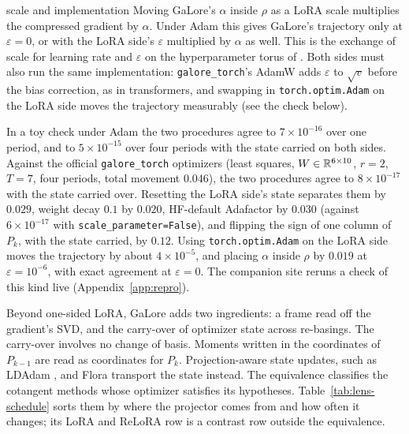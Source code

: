 \begin{remark*}{scale and implementation}
Moving GaLore's $\alpha$ inside $\rho$ as a LoRA scale multiplies the compressed gradient by $\alpha$. Under Adam this
gives GaLore's trajectory only at $\varepsilon=0$, or with the LoRA side's $\varepsilon$ multiplied by $\alpha$ as well.
This is the exchange of scale for learning rate and $\varepsilon$ on the hyperparameter torus of
. Both sides must also run the same implementation: \texttt{galore\_torch}'s AdamW adds
$\varepsilon$ to $\sqrt v$ before the bias correction, as in transformers, and swapping in \texttt{torch.optim.Adam} on
the LoRA side moves the trajectory measurably (see the check below).
\end{remark*}

\noindent{}\enspace In a toy check under Adam the two procedures agree to $7\times10^{-16}$ over one
period, and to $5\times10^{-15}$ over four periods with the state carried on both sides. Against the official
\texttt{galore\_torch} optimizers (least squares, $W\in\mathbb{R}^{6\times10}$, $r=2$, $T=7$, four periods, total movement
$0.046$), the two procedures agree to $8\times10^{-17}$ with the state carried over. Resetting the LoRA side's state
separates them by $0.029$, weight decay $0.1$ by $0.020$, HF-default Adafactor by $0.030$ (against $6\times10^{-17}$
with \texttt{scale\_\allowbreak parameter=False}), and flipping the sign of one column of $P_k$, with the state carried, by $0.12$.
Using \texttt{torch.optim.Adam} on the LoRA side moves the trajectory by about $4\times10^{-5}$, and placing $\alpha$
inside $\rho$ by $0.019$ at $\varepsilon=10^{-6}$, with exact agreement at $\varepsilon=0$. The companion site reruns a
check of this kind live (Appendix~\ref{app:repro}).

\begin{explains}
Beyond one-sided LoRA, GaLore adds two ingredients: a frame read off the gradient's SVD, and the carry-over of optimizer
state across re-basings. The carry-over involves no change of basis. Moments written in the coordinates of $P_{k-1}$
are read as coordinates for $P_k$. Projection-aware state updates, such as LDAdam \citep{xrobert2025ldadam}, and Flora
transport the state instead. The equivalence classifies the cotangent methods whose optimizer satisfies its hypotheses.
Table~\ref{tab:lens-schedule} sorts them by where the projector comes from and how often it changes; its LoRA and
ReLoRA row is a contrast row outside the equivalence.
\end{explains}


